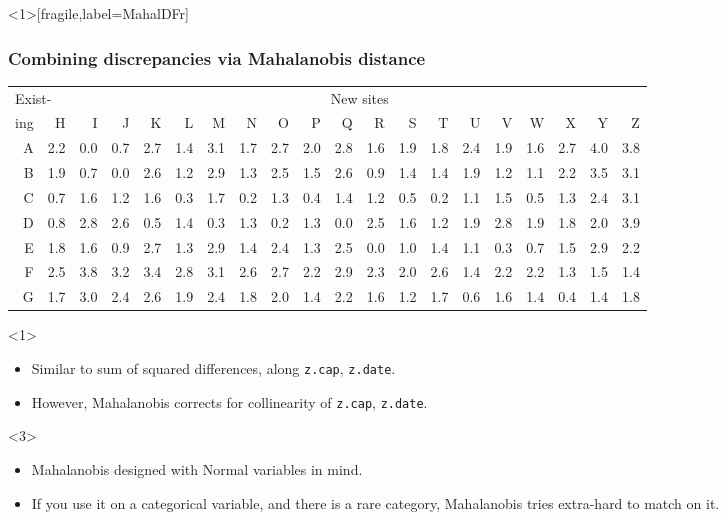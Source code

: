 \begin{frame}<1>[fragile,label=MahalDFr]
\frametitle{Combining discrepancies via Mahalanobis distance}
\addtolength{\tabcolsep}{-\tabcolsepadj} \vfill
{\footnotesize
\begin{tabular}{|r|rrrrrrrrrrrrrrrrrrr|}
\hline
\multicolumn{2}{|l}{Exist-} & \multicolumn{18}{c|}{New sites} \\
\multicolumn{1}{|l}{ing}& H & I & J & K & L & M & N & O & P & Q & R & S & T & U & V & W & X & Y & Z \\ 
  \hline
A & 2.2 & 0.0 & 0.7 & 2.7 & 1.4 & 3.1 & 1.7 & 2.7 & 2.0 & 2.8 & 1.6 & 1.9 & 1.8 & 2.4 & 1.9 & 1.6 & 2.7 & 4.0 & 3.8 \\ 
  B & 1.9 & 0.7 & 0.0 & 2.6 & 1.2 & 2.9 & 1.3 & 2.5 & 1.5 & 2.6 & 0.9 & 1.4 & 1.4 & 1.9 & 1.2 & 1.1 & 2.2 & 3.5 & 3.1 \\ 
  C & 0.7 & 1.6 & 1.2 & 1.6 & 0.3 & 1.7 & 0.2 & 1.3 & 0.4 & 1.4 & 1.2 & 0.5 & 0.2 & 1.1 & 1.5 & 0.5 & 1.3 & 2.4 & 3.1 \\ 
  D & 0.8 & 2.8 & 2.6 & 0.5 & 1.4 & 0.3 & 1.3 & 0.2 & 1.3 & 0.0 & 2.5 & 1.6 & 1.2 & 1.9 & 2.8 & 1.9 & 1.8 & 2.0 & 3.9 \\ 
  E & 1.8 & 1.6 & 0.9 & 2.7 & 1.3 & 2.9 & 1.4 & 2.4 & 1.3 & 2.5 & 0.0 & 1.0 & 1.4 & 1.1 & 0.3 & 0.7 & 1.5 & 2.9 & 2.2 \\ 
  F & 2.5 & 3.8 & 3.2 & 3.4 & 2.8 & 3.1 & 2.6 & 2.7 & 2.2 & 2.9 & 2.3 & 2.0 & 2.6 & 1.4 & 2.2 & 2.2 & 1.3 & 1.5 & 1.4 \\ 
  G & 1.7 & 3.0 & 2.4 & 2.6 & 1.9 & 2.4 & 1.8 & 2.0 & 1.4 & 2.2 & 1.6 & 1.2 & 1.7 & 0.6 & 1.6 & 1.4 & 0.4 & 1.4 & 1.8 \\ 
   \hline
\end{tabular}
}
\vfill \addtolength{\tabcolsep}{\tabcolsepadj}

\only<1\mynoteonly>{
  \begin{itemize}
  \item Similar to sum of squared differences, along \texttt{z.cap}, \texttt{z.date}.
\item However, Mahalanobis corrects for collinearity of \texttt{z.cap}, \texttt{z.date}.
  \end{itemize}
}
\only<3\mynoteonly>{
  \begin{itemize}
  \item Mahalanobis designed with Normal variables in mind.
  \item If you use it on a categorical variable, and there is a rare category, Mahalanobis tries extra-hard to match on it.
  \end{itemize}
}
\end{frame}


